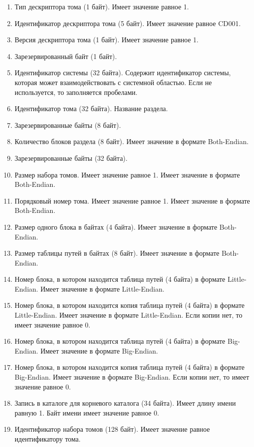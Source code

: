 \begin{enumerate}
\item Тип дескриптора тома (1 байт). Имеет значение равное 1.
\item Идентификатор дескриптора тома (5 байт). Имеет значение равное \textquotedbl CD001\textquotedbl.
\item Версия дескриптора тома (1 байт). Имеет значение равное 1.
\item Зарезервированный байт (1 байт).
\item Идентификатор системы (32 байта). Содержит идентификатор системы, которая может взаимодействовать с системной областью. Если не используется, то заполняется пробелами.
\item Идентификатор тома (32 байта). Название раздела.
\item Зарезервированные байты (8 байт).
\item Количество блоков раздела (8 байт). Имеет значение в формате Both-Endian.
\item Зарезервированные байты (32 байта).
\item Размер набора томов. Имеет значение равное 1. Имеет значение в формате Both-Endian.
\item Порядковый номер тома. Имеет значение равное 1. Имеет значение в формате Both-Endian.
\item Размер одного блока в байтах (4 байта). Имеет значение в формате Both-Endian.
\item Размер таблицы путей в байтах (8 байт). Имеет значение в формате Both-Endian.
\item Номер блока, в котором находится таблица путей (4 байта) в формате Little-Endian. Имеет значение в формате Little-Endian.
\item Номер блока, в котором находится копия таблица путей (4 байта) в формате Little-Endian. Имеет значение в формате Little-Endian. Если копии нет, то имеет значение равное 0.
\item Номер блока, в котором находится таблица путей (4 байта) в формате Big-Endian. Имеет значение в формате Big-Endian.
\item Номер блока, в котором находится копия таблица путей (4 байта) в формате Big-Endian. Имеет значение в формате Big-Endian. Если копии нет, то имеет значение равное 0.
\item Запись в каталоге для корневого каталога (34 байта). Имеет длину имени равную 1. Байт имени имеет значение равное 0.
\item Идентификатор набора томов (128 байт). Имеет значение равное идентификатору тома.

\end{enumerate}
